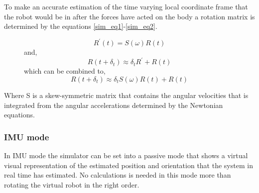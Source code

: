 To make an accurate estimation of the time varying local coordinate frame that the robot would be in after the forces have acted on the body a rotation matrix is determined by the equations \ref{sim_eq1}-\ref{sim_eq2}\cite{petercorke}.


\begin{figure}[!ht]
\begin{center}
\begin{equation}
R^{'}(t)=S(\omega)R(t)
\label{sim_eq1}
\end{equation}
and,
\begin{equation}
R(t+\delta _{t})\approx \delta _{t}R^{'}+R(t)
\end{equation}
which can be combined to,
\begin{equation}
R(t+\delta _{t})\approx \delta _{t}S(\omega )R(t)+R(t)
\label{sim_eq2}
\end{equation}
\end{center}
\end{figure}

Where S is a skew-symmetric matrix that contains the angular velocities that is integrated from the angular accelerations determined by the Newtonian equations.
		
	\subsubsection*{IMU mode}
In IMU mode the simulator can be set into a passive mode that shows a virtual visual representation of the estimated position and orientation that the system in real time has estimated.
No calculations is needed in this mode more than rotating the virtual robot in the right order.